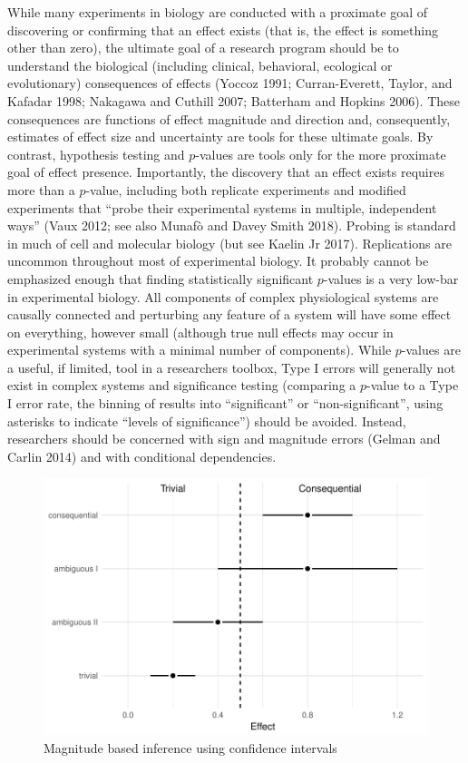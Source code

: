 \documentclass[]{article}
\theoremstyle{definition}
\theoremstyle{definition}
\theoremstyle{definition}
\theoremstyle{remark}
\begin{document}
While many experiments in biology are conducted with a proximate goal of
discovering or confirming that an effect exists (that is, the effect is
something other than zero), the ultimate goal of a research program
should be to understand the biological (including clinical, behavioral,
ecological or evolutionary) consequences of effects (Yoccoz 1991;
Curran-Everett, Taylor, and Kafadar 1998; Nakagawa and Cuthill 2007;
Batterham and Hopkins 2006). These consequences are functions of effect
magnitude and direction and, consequently, estimates of effect size and
uncertainty are tools for these ultimate goals. By contrast, hypothesis
testing and \(p\)-values are tools only for the more proximate goal of
effect presence. Importantly, the discovery that an effect exists
requires more than a \(p\)-value, including both replicate experiments
and modified experiments that ``probe their experimental systems in
multiple, independent ways'' (Vaux 2012; see also Munafò and Davey Smith
2018). Probing is standard in much of cell and molecular biology (but
see Kaelin Jr 2017). Replications are uncommon throughout most of
experimental biology. It probably cannot be emphasized enough that
finding statistically significant \(p\)-values is a very low-bar in
experimental biology. All components of complex physiological systems
are causally connected and perturbing any feature of a system will have
some effect on everything, however small (although true null effects may
occur in experimental systems with a minimal number of components).
While \(p\)-values are a useful, if limited, tool in a researchers
toolbox, Type I errors will generally not exist in complex systems and
significance testing (comparing a \(p\)-value to a Type I error rate,
the binning of results into ``significant'' or ``non-significant'',
using asterisks to indicate ``levels of significance'') should be
avoided. Instead, researchers should be concerned with sign and
magnitude errors (Gelman and Carlin 2014) and with conditional
dependencies.

\begin{figure}
\includegraphics{../output/confidence} \caption{Magnitude based inference using confidence intervals}\label{fig:confidence}
\end{figure}
\end{document}
